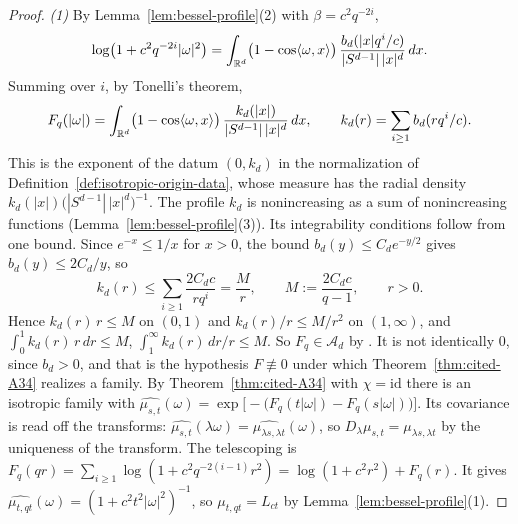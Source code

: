 \begin{proof}
\emph{(1)} By Lemma~\ref{lem:bessel-profile}(2) with $\beta = c^2q^{-2i}$,
\[
  \log\bigl(1 + c^2q^{-2i}|\omega|^2\bigr)
   = \int_{\mathbb{R}^d}\bigl(1 - \cos\langle\omega, x\rangle\bigr)\,
     \frac{b_d(|x|q^i/c)}{|S^{d-1}|\,|x|^d}\,dx .
\]
Summing over $i$, by Tonelli's theorem,
\[
  F_q(|\omega|) = \int_{\mathbb{R}^d}\bigl(1 - \cos\langle\omega, x\rangle\bigr)\,
   \frac{k_d(|x|)}{|S^{d-1}|\,|x|^d}\,dx , \qquad k_d(r) = \sum_{i \ge 1}b_d(rq^i/c) .
\]
This is the exponent of the datum $(0, k_d)$ in the normalization of
Definition~\ref{def:isotropic-origin-data}, whose \Levy{} measure has the radial density
$k_d(|x|)\bigl(|S^{d-1}|\,|x|^d\bigr)^{-1}$. The profile $k_d$ is nonincreasing as a sum of
nonincreasing functions (Lemma~\ref{lem:bessel-profile}(3)).
Its integrability conditions follow from one bound. Since $e^{-x} \le 1/x$ for $x > 0$, the bound
$b_d(y) \le C_de^{-y/2}$ gives $b_d(y) \le 2C_d/y$, so
\[
  k_d(r) \le \sum_{i \ge 1}\frac{2C_dc}{rq^i} = \frac{M}{r} , \qquad M := \frac{2C_dc}{q - 1} ,
  \qquad r > 0 .
\]
Hence $k_d(r)\,r \le M$ on $(0, 1)$ and $k_d(r)/r \le M/r^2$ on $(1, \infty)$, and
$\int_0^1k_d(r)\,r\,dr \le M$, $\int_1^\infty k_d(r)\,dr/r \le M$. So $F_q \in \mathcal{A}_d$ by . It is not identically $0$, since $b_d > 0$, and that is the hypothesis
$F \not\equiv 0$ under which Theorem~\ref{thm:cited-A34} realizes a family.
By Theorem~\ref{thm:cited-A34} with $\chi = \mathrm{id}$ there is an isotropic family with
$\widehat{\mu_{s,t}}(\omega) = \exp\bigl[-\bigl(F_q(t|\omega|) - F_q(s|\omega|)\bigr)\bigr]$. Its
covariance is read off the transforms: $\widehat{\mu_{s,t}}(\lambda\omega) =
\widehat{\mu_{\lambda s,\lambda t}}(\omega)$, so $D_\lambda\mu_{s,t} = \mu_{\lambda s,\lambda t}$ by
the uniqueness of the transform. The telescoping is
$F_q(qr) = \sum_{i \ge 1}\log(1 + c^2q^{-2(i-1)}r^2) = \log(1 + c^2r^2) + F_q(r)$. It gives
$\widehat{\mu_{t,qt}}(\omega) = (1 + c^2t^2|\omega|^2)^{-1}$, so $\mu_{t,qt} = L_{ct}$ by
Lemma~\ref{lem:bessel-profile}(1).


\end{proof}
